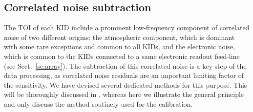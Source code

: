 \subsection{Correlated noise subtraction}
\label{se:toi_proc}
The TOI of each KID include a prominent low-frequency component of correlated noise of two
different origins: the atmospheric component, which is dominant
{\lp with some rare exceptions} and common to all KIDs, and the electronic noise, which is common to the KIDs connected
to a same electronic readout feed-line (see
Sect.~\ref{se:array}). The subtraction of this correlated noise is a key
step of the data processing, as correlated noise residuals are an
important limiting factor of the sensitivity. We have devised several
dedicated methods for this purpose. This will be thoroughly
discussed in \citet{Ponthieu2019}, whereas here we illustrate the
general principle and only discuss the method routinely used for
the calibration.

